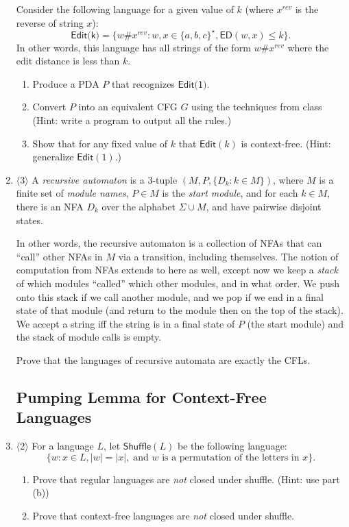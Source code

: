 \documentclass[a4paper,american,12pt]{book}
\newcommand{\Level}[1]{{\color{blue} $\langle$#1$\rangle$}}
\begin{document}
\begin{enumerate}
Consider the following language for a given value of $k$ (where $x^{rev}$ is the reverse of string $x$):
\[
\textsf{Edit(k)} = \{ w \# x^{rev} : w, x \in \{a, b, c\}^\star, \textsf{ED}(w,x) \le k  \}.
\]
In other words, this language has all strings of the form $w\# x^{rev}$ where the edit distance is less than $k$.
\begin{enumerate}
	\item Produce a PDA $P$ that recognizes $\textsf{Edit(1)}$.
	\item Convert $P$ into an equivalent CFG $G$ using the techniques from class (Hint: write a program to output all the rules.)
	\item Show that for any fixed value of $k$ that $\textsf{Edit}(k)$ is context-free. (Hint: generalize $\textsf{Edit}(1)$.)
\end{enumerate}

\item \Level{3} A \emph{recursive automaton} is a 3-tuple $(M, P, \{D_k : k \in M \})$, where $M$ is a finite set of \emph{module names}, $P \in M$ is the \emph{start module}, and for each $k \in M$, there is an NFA $D_k$ over the alphabet $\Sigma \cup M$, and have pairwise disjoint states. 

In other words, the recursive automaton is a collection of NFAs that can ``call'' other NFAs in $M$ via a transition, including themselves. 
The notion of computation from NFAs extends to here as well, except now we keep a \emph{stack} of which modules ``called'' which other modules, and in what order. 
We push onto this stack if we call another module, and we pop if we end in a final state of that module (and return to the module then on the top of the stack).
We accept a string iff the string is in a final state of $P$ (the start module) and the stack of module calls is empty.
		
Prove that the languages of recursive automata are exactly the CFLs.

\subsection{Pumping Lemma for Context-Free Languages}

\item \Level{2} For a language $L$, let $\textsf{Shuffle}(L)$ be the following language:
\[
\{ w : x \in L, |w| = |x|,\;\text{and $w$ is a permutation of the letters in $x$} \}.
\]
\begin{enumerate}
	\item Prove that regular languages are \emph{not} closed under shuffle. (Hint: use part (b))
	\item Prove that context-free languages are \emph{not} closed under shuffle.
\end{enumerate}


\end{enumerate}
\end{document}
